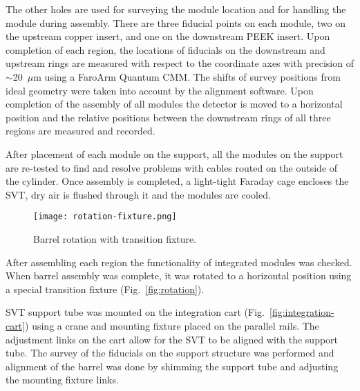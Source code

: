 The other holes are used for surveying the module location and for handling the module during assembly. There are three fiducial points on each module, two on the upstream copper insert, and one on the downstream PEEK insert. Upon completion of each region, the locations of fiducials on the downstream and upstream rings are measured with respect to the coordinate axes with precision of $\sim$20~$\mu$m using a FaroArm Quantum CMM. The shifts of survey positions from ideal geometry were taken into account by the alignment software. Upon completion of the assembly of all modules the detector is moved to a horizontal position and the relative positions between the downstream rings of all three regions are measured and recorded.

After placement of each module on the support, all the modules on the support are re-tested to find and resolve problems with cables routed on the outside of the cylinder. Once assembly is completed, a light-tight Faraday cage encloses the SVT, dry air is flushed through it and the modules are cooled. 

%

\begin{figure}[hbt] 
\centering 
\texttt{[image: rotation-fixture.png]}
\caption{Barrel rotation with transition fixture.}
\label{fig:rotation-fixture}
\end{figure}

After assembling each region the functionality of integrated modules was checked. When barrel assembly was complete, it was rotated to a horizontal position using a special transition fixture (Fig.~\ref{fig:rotation}). 

SVT support tube was mounted on the integration cart (Fig.~\ref{fig:integration-cart}) using a crane and mounting fixture placed on the parallel rails. The adjustment links on the cart allow for the SVT to be aligned with the support tube. The survey of the fiducials on the support structure was performed and alignment of the barrel was done by shimming the support tube and adjusting the mounting fixture links. 

